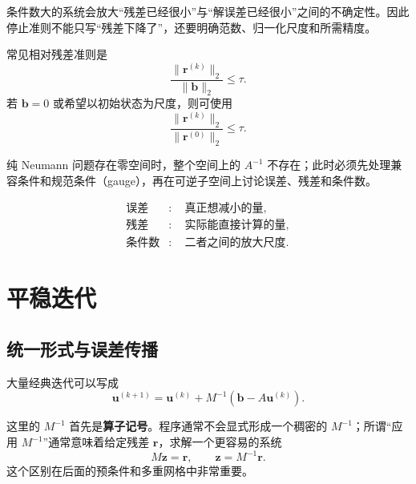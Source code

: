 条件数大的系统会放大“残差已经很小”与“解误差已经很小”之间的不确定性。因此停止准则不能只写“残差下降了”，还要明确范数、归一化尺度和所需精度。

常见相对残差准则是
\begin{equation}
\frac{\|\bm r^{(k)}\|_2}{\|\bm b\|_2}
\le
\tau.
\label{eq:linear-solvers-relative-residual-stop}
\end{equation}
若 $\bm b=0$ 或希望以初始状态为尺度，则可使用
\begin{equation}
\frac{\|\bm r^{(k)}\|_2}{\|\bm r^{(0)}\|_2}
\le
\tau.
\end{equation}

纯 Neumann 问题存在零空间时，整个空间上的 $A^{-1}$ 不存在；此时必须先处理兼容条件和规范条件（gauge），再在可逆子空间上讨论误差、残差和条件数。

\begin{keybox}
\[
\boxed{
\begin{aligned}
\text{误差}&:\quad\text{真正想减小的量},\\
\text{残差}&:\quad\text{实际能直接计算的量},\\
\text{条件数}&:\quad\text{二者之间的放大尺度}.
\end{aligned}
}
\]
\end{keybox}

\section{平稳迭代}

\subsection{统一形式与误差传播}

大量经典迭代可以写成
\begin{equation}
\bm u^{(k+1)}
=
\bm u^{(k)}
+
M^{-1}
\left(
\bm b-A\bm u^{(k)}
\right).
\label{eq:linear-solvers-stationary}
\end{equation}

这里的 $M^{-1}$ 首先是\textbf{算子记号}。程序通常不会显式形成一个稠密的 $M^{-1}$；所谓“应用 $M^{-1}$”通常意味着给定残差 $\bm r$，求解一个更容易的系统
\begin{equation}
M\bm z=\bm r,
\qquad
\bm z=M^{-1}\bm r.
\label{eq:linear-solvers-preconditioner-apply-mental}
\end{equation}
这个区别在后面的预条件和多重网格中非常重要。

